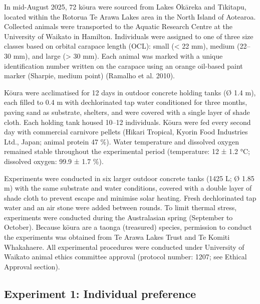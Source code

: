 \documentclass[
  12pt,
  a4paper,
  oneside]{scrbook}
\begin{document}
In mid-August 2025, 72 kōura were sourced from Lakes Ōkāreka and
Tikitapu, located within the Rotorua Te Arawa Lakes area in the North
Island of Aotearoa. Collected animals were transported to the Aquatic
Research Centre at the University of Waikato in Hamilton. Individuals
were assigned to one of three size classes based on orbital carapace
length (OCL): small (\textless{} 22 mm), medium (22--30 mm), and large
(\textgreater{} 30 mm). Each animal was marked with a unique
identification number written on the carapace using an orange oil-based
paint marker (Sharpie, medium point) (Ramalho et al. 2010).

Kōura were acclimatised for 12 days in outdoor concrete holding tanks (Ø
1.4 m), each filled to 0.4 m with dechlorinated tap water conditioned
for three months, paving sand as substrate, shelters, and were covered
with a single layer of shade cloth. Each holding tank housed 10--12
individuals. Kōura were fed every second day with commercial carnivore
pellets (Hikari Tropical, Kyorin Food Industries Ltd., Japan; animal
protein 47 \%). Water temperature and dissolved oxygen remained stable
throughout the experimental period (temperature: 12 ± 1.2 °C; dissolved
oxygen: 99.9 ± 1.7 \%).

Experiments were conducted in six larger outdoor concrete tanks (1425 L;
Ø 1.85 m) with the same substrate and water conditions, covered with a
double layer of shade cloth to prevent escape and minimise solar
heating. Fresh dechlorinated tap water and an air stone were added
between rounds. To limit thermal stress, experiments were conducted
during the Australasian spring (September to October). Because kōura are
a taonga (treasured) species, permission to conduct the experiments was
obtained from Te Arawa Lakes Trust and Te Komiti Whakahaere. All
experimental procedures were conducted under University of Waikato
animal ethics committee approval (protocol number: 1207; see Ethical
Approval section).

\subsection{Experiment 1: Individual
preference}\label{experiment-1-individual-preference}
\end{document}
